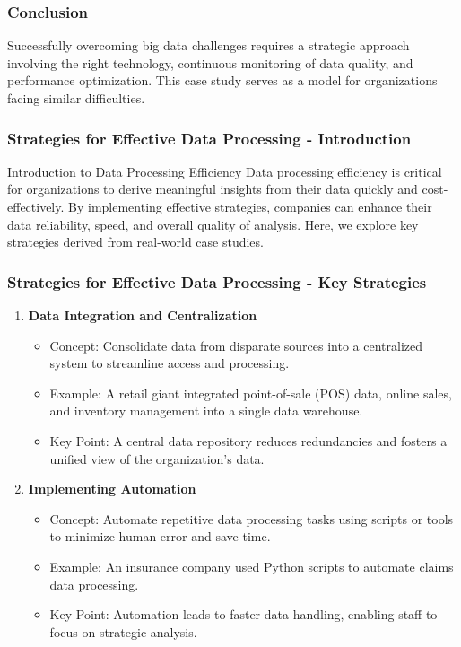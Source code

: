 \documentclass[aspectratio=169]{beamer}
\begin{document}
\begin{frame}[fragile]
    \frametitle{Conclusion}
    Successfully overcoming big data challenges requires a strategic approach involving the right technology, 
    continuous monitoring of data quality, and performance optimization. This case study serves as a model 
    for organizations facing similar difficulties.
\end{frame}

\begin{frame}[fragile]
    \frametitle{Strategies for Effective Data Processing - Introduction}
    \begin{block}{Introduction to Data Processing Efficiency}
        Data processing efficiency is critical for organizations to derive meaningful insights from their data quickly and cost-effectively. 
        By implementing effective strategies, companies can enhance their data reliability, speed, and overall quality of analysis. 
        Here, we explore key strategies derived from real-world case studies.
    \end{block}
\end{frame}

\begin{frame}[fragile]
    \frametitle{Strategies for Effective Data Processing - Key Strategies}
    \begin{enumerate}
        \item \textbf{Data Integration and Centralization}
            \begin{itemize}
                \item Concept: Consolidate data from disparate sources into a centralized system to streamline access and processing.
                \item Example: A retail giant integrated point-of-sale (POS) data, online sales, and inventory management into a single data warehouse.
                \item Key Point: A central data repository reduces redundancies and fosters a unified view of the organization’s data.
            \end{itemize}
        \item \textbf{Implementing Automation}
            \begin{itemize}
                \item Concept: Automate repetitive data processing tasks using scripts or tools to minimize human error and save time.
                \item Example: An insurance company used Python scripts to automate claims data processing.
                \item Key Point: Automation leads to faster data handling, enabling staff to focus on strategic analysis.
            \end{itemize}
    \end{enumerate}
\end{frame}
\end{document}
